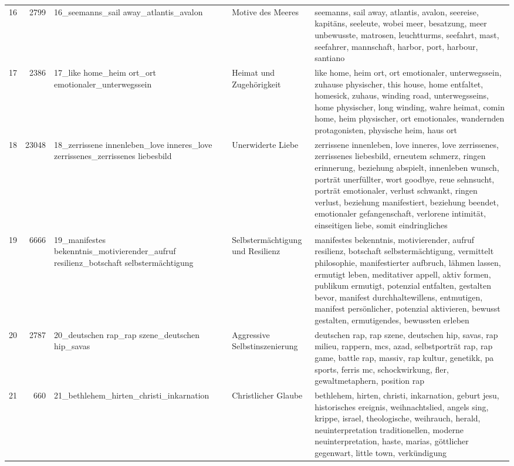 \begin{longtable}{rrlll}
16 & 2799 & 16\_seemanns\_sail away\_atlantis\_avalon & Motive des Meeres & seemanns, sail away, atlantis, avalon, seereise, kapitäns, seeleute, wobei meer, besatzung, meer unbewusste, matrosen, leuchtturms, seefahrt, mast, seefahrer, mannschaft, harbor, port, harbour, santiano \\
17 & 2386 & 17\_like home\_heim ort\_ort emotionaler\_unterwegssein & Heimat und Zugehörigkeit & like home, heim ort, ort emotionaler, unterwegssein, zuhause physischer, this house, home entfaltet, homesick, zuhaus, winding road, unterwegsseins, home physischer, long winding, wahre heimat, comin home, heim physischer, ort emotionales, wandernden protagonisten, physische heim, haus ort \\
18 & 23048 & 18\_zerrissene innenleben\_love inneres\_love zerrissenes\_zerrissenes liebesbild & Unerwiderte Liebe & zerrissene innenleben, love inneres, love zerrissenes, zerrissenes liebesbild, erneutem schmerz, ringen erinnerung, beziehung abspielt, innenleben wunsch, porträt unerfüllter, wort goodbye, reue sehnsucht, porträt emotionaler, verlust schwankt, ringen verlust, beziehung manifestiert, beziehung beendet, emotionaler gefangenschaft, verlorene intimität, einseitigen liebe, somit eindringliches \\
19 & 6666 & 19\_manifestes bekenntnis\_motivierender\_aufruf resilienz\_botschaft selbstermächtigung & Selbstermächtigung und Resilienz & manifestes bekenntnis, motivierender, aufruf resilienz, botschaft selbstermächtigung, vermittelt philosophie, manifestierter aufbruch, lähmen lassen, ermutigt leben, meditativer appell, aktiv formen, publikum ermutigt, potenzial entfalten, gestalten bevor, manifest durchhaltewillens, entmutigen, manifest persönlicher, potenzial aktivieren, bewusst gestalten, ermutigendes, bewussten erleben \\
20 & 2787 & 20\_deutschen rap\_rap szene\_deutschen hip\_savas & Aggressive Selbstinszenierung & deutschen rap, rap szene, deutschen hip, savas, rap milieu, rappern, mcs, azad, selbstporträt rap, rap game, battle rap, massiv, rap kultur, genetikk, pa sports, ferris mc, schockwirkung, fler, gewaltmetaphern, position rap \\
21 & 660 & 21\_bethlehem\_hirten\_christi\_inkarnation & Christlicher Glaube & bethlehem, hirten, christi, inkarnation, geburt jesu, historisches ereignis, weihnachtslied, angels sing, krippe, israel, theologische, weihrauch, herald, neuinterpretation traditionellen, moderne neuinterpretation, haste, marias, göttlicher gegenwart, little town, verkündigung \\

\end{longtable}
